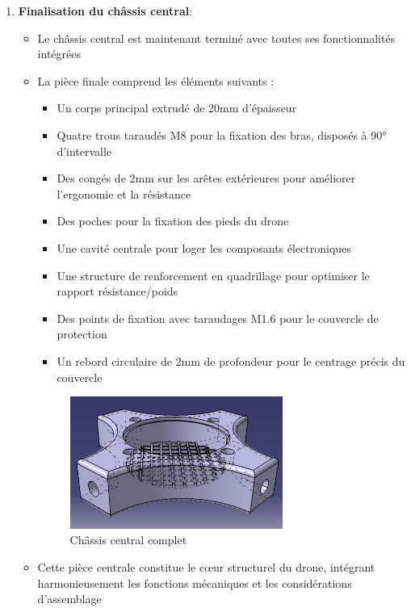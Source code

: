 \documentclass[a4paper,12pt]{report}
\begin{document}
\begin{enumerate}
    \item \textbf{Finalisation du châssis central}:
    \begin{itemize}
        \item Le châssis central est maintenant terminé avec toutes ses fonctionnalités intégrées
        \item La pièce finale comprend les éléments suivants :
        \begin{itemize}
            \item Un corps principal extrudé de 20mm d'épaisseur
            \item Quatre trous taraudés M8 pour la fixation des bras, disposés à 90° d'intervalle
            \item Des congés de 2mm sur les arêtes extérieures pour améliorer l'ergonomie et la résistance
            \item Des poches pour la fixation des pieds du drone
            \item Une cavité centrale pour loger les composants électroniques
            \item Une structure de renforcement en quadrillage pour optimiser le rapport résistance/poids
            \item Des points de fixation avec taraudages M1.6 pour le couvercle de protection
            \item Un rebord circulaire de 2mm de profondeur pour le centrage précis du couvercle
        \end{itemize}
        \begin{figure}[H]
            \centering
            \includegraphics[width=0.7\textwidth]{images/chassis_central_final.png}
            \caption{Châssis central complet}
            \label{fig:chassis_central_complet}
        \end{figure}
        \item Cette pièce centrale constitue le cœur structurel du drone, intégrant harmonieusement les fonctions mécaniques et les considérations d'assemblage
    \end{itemize}
\end{enumerate}
\end{document}
